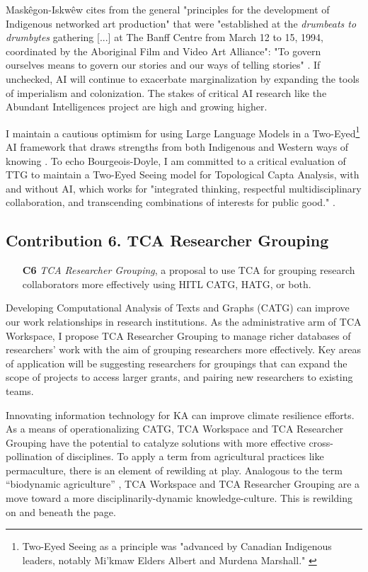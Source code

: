 Maskêgon-Iskwêw cites from the general "principles for the development of Indigenous networked art production" that were "established at the \textit{drumbeats to drumbytes} gathering [...] at The Banff Centre from March 12 to 15, 1994, coordinated by the Aboriginal Film and Video Art Alliance": "To govern ourselves means to govern our stories and our ways of telling stories" \citep[p. 19]{maskegon-iskwew_drumbeats_2005}. If unchecked, AI will continue to exacerbate marginalization by expanding the tools of imperialism and colonization. The stakes of critical AI research like the Abundant Intelligences project are high and growing higher. 

I maintain a cautious optimism for using Large Language Models in a Two-Eyed\footnote{Two-Eyed Seeing as a principle was "advanced by Canadian Indigenous leaders, notably Mi'kmaw Elders Albert and Murdena Marshall." \citep[p. 3]{bourgeois-doyle_two-eyed_2019}} AI framework that draws strengths from both Indigenous and Western ways of knowing \citep[p. 3]{bourgeois-doyle_two-eyed_2019}. To echo Bourgeois-Doyle, I am committed to a critical evaluation of TTG to maintain a Two-Eyed Seeing model for Topological Capta Analysis, with and without AI, which works for "integrated thinking, respectful multidisciplinary collaboration, and transcending combinations of interests for public good." \citep[p. 3]{bourgeois-doyle_two-eyed_2019}. 

\subsection{Contribution 6. TCA Researcher Grouping}
\begin{enumerate}
        \item[\textbf{C6}] \textit{TCA Researcher Grouping}, a proposal to use TCA for grouping research collaborators more effectively using HITL CATG, HATG, or both.
\end{enumerate}
Developing Computational Analysis of Texts and Graphs (CATG) can improve our work relationships in research institutions. As the administrative arm of TCA Workspace, I propose TCA Researcher Grouping to manage richer databases of researchers’ work with the aim of grouping researchers more effectively. Key areas of application will be suggesting researchers for groupings that can expand the scope of projects to access larger grants, and pairing new researchers to existing teams. 

Innovating information technology for KA can improve climate resilience efforts. As a means of operationalizing CATG, TCA Workspace and TCA Researcher Grouping have the potential to catalyze solutions with more effective cross-pollination of disciplines. To apply a term from agricultural practices like permaculture, there is an element of rewilding at play. Analogous to the term “biodynamic agriculture” \citep{steiner_what_2005}, TCA Workspace and TCA Researcher Grouping are a move toward a more disciplinarily-dynamic knowledge-culture. This is rewilding on and beneath the page.
